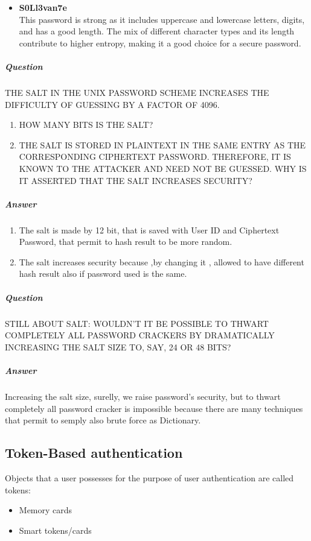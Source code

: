 \documentclass{article}
\begin{document}
\begin{itemize}
                            \item \textbf{S0Ll3van7e} \\
                            This password is strong as it includes uppercase and lowercase letters, digits, and has a good length. The mix of different character types and its length contribute to higher entropy, making it a good choice for a secure password.
                        \end{itemize}

                    \subparagraph{Question}
                        THE SALT IN THE UNIX PASSWORD SCHEME INCREASES THE
                    DIFFICULTY OF GUESSING BY A FACTOR OF 4096.
                    \begin{enumerate}
                        \item  HOW MANY BITS IS THE SALT?
                        \item  THE SALT IS STORED IN PLAINTEXT IN THE SAME ENTRY AS
                        THE CORRESPONDING CIPHERTEXT PASSWORD.
                        THEREFORE, IT IS KNOWN TO THE ATTACKER AND NEED
                        NOT BE GUESSED. WHY IS IT ASSERTED THAT THE SALT
                        INCREASES SECURITY?
                    \end{enumerate}
                    \subparagraph{Answer}
                    \begin{enumerate}
                        \item The salt is made by 12 bit, that is saved with User ID and Ciphertext Password, that permit to hash result to be more random.
                        \item The salt increases security because ,by changing it , allowed to have different hash result also if password used is the same. 
                    \end{enumerate}
                    \subparagraph{Question}
                    STILL ABOUT SALT:
                    WOULDN’T IT BE POSSIBLE TO THWART COMPLETELY ALL
                    PASSWORD CRACKERS BY DRAMATICALLY INCREASING THE SALT
                    SIZE TO, SAY, 24 OR 48 BITS?
                    \subparagraph{Answer}
                    Increasing the salt size, surelly, we raise password's security, but to thwart completely all password cracker is impossible because there are many techniques that permit to semply also brute force as Dictionary.  
        
        \subsection{Token-Based authentication}
                     Objects that a user possesses for the purpose
                     of user authentication are called tokens: 
                     \begin{itemize}
                      \item  Memory cards
                      \item  Smart tokens/cards
                     \end{itemize}
                    
\end{document}
